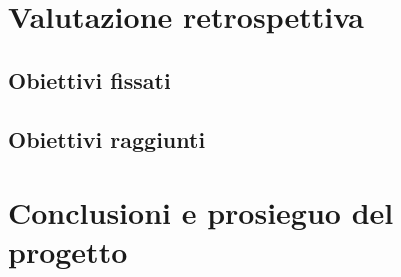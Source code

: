 \section{Valutazione retrospettiva}

	\subsection{Obiettivi fissati}
	
	\subsection{Obiettivi raggiunti}
	
\section{Conclusioni e prosieguo del progetto}